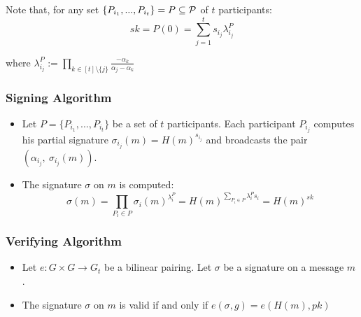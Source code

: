 Note that, for any set $\{P_{i_1}, ... , P_{i_t} \} = P \subseteq {\mathcal P}$ of $t$ participants: $$sk = P(0) = \sum_{j = 1}^t s_{i_j} \lambda_{i_j}^P$$

where $\lambda_{i_j}^P := \prod_{k \in [t] \setminus \{j\}} \frac{-\alpha_k}{\alpha_j - \alpha_k}$

\subsubsection*{Signing Algorithm}
\begin{itemize}[align = left, leftmargin=*, label={--}]

\item Let $P = \{P_{i_1}, ..., P_{i_t} \}$ be a set of $t$ participants. Each participant $P_{i_j}$ computes his partial signature $\sigma_{i_j} (m) = H(m)^{s_{i_j}}$ and broadcasts the pair $(\alpha_{i_j}, \ \sigma_{i_j} (m))$.

\item The signature $\sigma$ on $m$ is computed: $$ \sigma (m) = \prod_{P_i \in P} \sigma_i (m)^{\lambda_i^{P}}= H(m)^{\sum_{P_i \in P} \lambda_i^P s_i} = H(m)^{sk}$$
\end{itemize}

\subsubsection*{Verifying Algorithm}
\begin{itemize}[align = left, leftmargin=*, label={--}]
\item Let $e: G \times G \rightarrow G_t$ be a bilinear pairing. Let $\sigma$ be a signature on a message $m$.
\item The signature $\sigma$ on $m$ is valid if and only if $e(\sigma, g) = e(H(m), pk)$
\end{itemize}